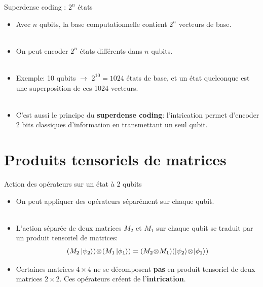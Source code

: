 \documentclass[aspectratio=169,12pt]{beamer}
\begin{document}
\begin{frame}{Superdense coding : $2^n$ états}
  \begin{itemize}[<+->]
    \setlength{\itemsep}{0.6em}
    \item Avec $n$ qubits, la base computationnelle contient $2^n$ vecteurs de base.
    \\~\\
    \item On peut encoder $2^n$ états différents dans $n$ qubits.
    \\~\\
    \item Exemple: 10 qubits $\rightarrow$ $2^{10} = 1024$ états de base,
     et un état quelconque est une superposition de ces 1024 vecteurs.
    \\~\\
    \item C'est aussi le principe du \textbf{superdense coding}: l'intrication permet d'encoder
     2 bits classiques d'information en transmettant un seul qubit.
  \end{itemize}
\end{frame}

\section{Produits tensoriels de matrices}

\begin{frame}{Action des opérateurs sur un état à 2 qubits}
  \begin{itemize}[<+->]
    \item On peut appliquer des opérateurs séparément sur chaque qubit.
    \\~\\
    \item L'action séparée de deux matrices $M_2$ et $M_1$ sur chaque qubit se traduit par un produit tensoriel de matrices:
    \[
      (M_2\ket{\psi_2})\!\otimes\!(M_1\ket{\phi_1}) = (M_2\!\otimes\! M_1)(\ket{\psi_2}\!\otimes\!\ket{\phi_1})
    \]
    \item Certaines matrices $4\times4$ ne se décomposent \textbf{pas} en produit tensoriel de deux matrices $2\times2$. Ces opérateurs créent de l'\textbf{intrication}.
  \end{itemize}
\end{frame}
\end{document}
